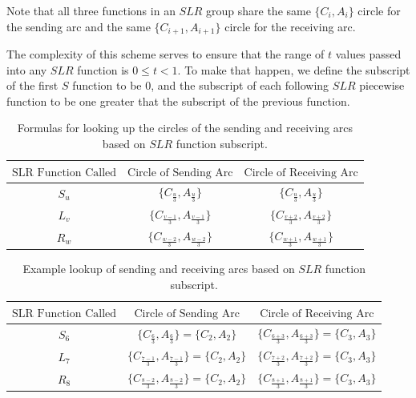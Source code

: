 \documentclass{article}
\begin{document}
Note that all three functions in an $SLR$ group share the same $\{C_i, A_i\}$ circle for the sending arc and the same $\{C_{i+1}, A_{i+1}\}$ circle for the receiving arc.

The complexity of this scheme serves to ensure that the range of $t$ values passed into any $SLR$ function is $0 \leq t < 1$. To make that happen, we define the subscript of the first $S$ function to be $0$, and the subscript of each following $SLR$ piecewise function to be one greater that the subscript of the previous function.

\begin{table}[h]
\centering
\begin{tabular}{|c|c|c|}
\hline
$\text{SLR Function Called}$ & $\text{Circle of Sending Arc}$ & $\text{Circle of Receiving Arc}$ \\
\hline
$S_u$ & $\{C_\frac{u}{3}, A_\frac{u}{3}\}$ & $\{C_\frac{u}{3}, A_\frac{u}{3}\}$\\
$L_v$ & $\{C_\frac{v-1}{3}, A_\frac{v-1}{3}\}$ & $\{C_\frac{v+2}{3}, A_\frac{v+2}{3}\}$\\
$R_w$ & $\{C_\frac{w-2}{3}, A_\frac{w-2}{3}\}$ & $\{C_\frac{w+1}{3}, A_\frac{w+1}{3}\}$\\
\hline
\end{tabular}
\caption{Formulas for looking up the circles of the sending and receiving arcs based on $SLR$ function subscript.}
\label{tab:my_conversion_from_SLR_subscript_to_circle_subscripts}
\end{table}

\begin{table}[h]
\centering
\begin{tabular}{|c|c|c|}
\hline
$\text{SLR Function Called}$ & $\text{Circle of Sending Arc}$ & $\text{Circle of Receiving Arc}$ \\
\hline
$S_6$ & $\{C_\frac{6}{3}, A_\frac{6}{3}\} = \{C_2, A_2\}$ & $\{C_\frac{6+3}{3}, A_\frac{6+3}{3}\} = \{C_3, A_3\}$\\
$L_7$ & $\{C_\frac{7-1}{3}, A_\frac{7-1}{3}\} = \{C_2, A_2\}$ & $\{C_\frac{7+2}{3}, A_\frac{7+2}{3}\} = \{C_3, A_3\}$\\
$R_8$ & $\{C_\frac{8-2}{3}, A_\frac{8-2}{3}\} = \{C_2, A_2\}$ & $\{C_\frac{8+1}{3}, A_\frac{8+1}{3}\} = \{C_3, A_3\}$\\
\hline
\end{tabular}
\caption{Example lookup of sending and receiving arcs based on $SLR$ function subscript.}
\label{tab:my_conversion_from_SLR_subscript_to_circle_subscripts_EXAMPLE}
\end{table}
\end{document}
